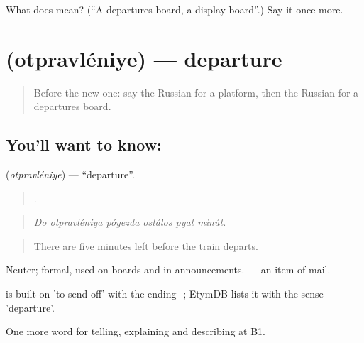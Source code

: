 \begin{tcolorbox}[breakable,colback=teal!4,colframe=teal!35!black,title={Before you move on}]
What does  mean? (\textquotedblleft{}A departures board, a display board\textquotedblright{}.) Say it once more.
\end{tcolorbox}
\section[\texorpdfstring{\ru{отправление} (otpravléniye)}{отправление (otpravléniye)}]{ (otpravléniye) — departure}

\label{lesson:RU-C414-otpravleniye}



\begin{quote}
Before the new one: say the Russian for a platform, then the Russian for a departures board.
\end{quote}

\subsection*{You'll want to know: }
\textbf{} (\emph{otpravléniye}) — \textquotedblleft{}departure\textquotedblright{}.

\begin{quote}
     .
\end{quote}

\begin{quote}
\emph{Do otpravléniya póyezda ostálos pyat minút.}
\end{quote}

\begin{quote}
There are five minutes left before the train departs.
\end{quote}

Neuter; formal, used on boards and in announcements. \emph{ } — an item of mail.

\begin{cousinweb}
\emph{} is built on \emph{} 'to send off' with the ending \emph{-}; EtymDB lists it with the sense 'departure'.
\end{cousinweb}

\begin{grammarlens}[title={What you've built}]
One more word for telling, explaining and describing at B1.
\end{grammarlens}

